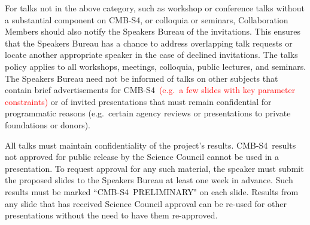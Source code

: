 \documentclass[12pt]{article}
\newcommand\collabname{CMB-S4}
\newcommand{\revision}[1]{\textcolor{Red}{#1}}
\begin{document}
For talks not in the above category, such as workshop or conference talks without a substantial component on \collabname, or colloquia or seminars, Collaboration Members should also notify the Speakers Bureau of the 
invitations. %
This ensures that the Speakers Bureau has a chance to address overlapping talk requests or locate another appropriate speaker in the case of declined invitations.  The talks policy applies to all workshops, meetings, colloquia, public lectures, and seminars.  The Speakers Bureau need not be informed of talks on other subjects that contain brief advertisements for \collabname\ \revision{(e.g.~a few slides with key parameter constraints)} or of invited presentations that must remain confidential for programmatic reasons (e.g.~certain agency reviews or presentations to private foundations or donors).



All talks must maintain confidentiality of the project's results. \collabname\ results not approved for public release by the Science Council cannot be used in a presentation. To request approval for any such material, the speaker must submit the proposed slides to the Speakers Bureau at least one week in advance. Such results must be marked ``\collabname\ PRELIMINARY" on each slide. Results from any slide that has received Science Council approval can be re-used for other presentations without the need to have them re-approved. %
\end{document}
